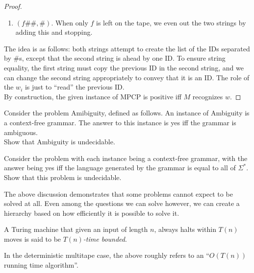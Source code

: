\begin{proof}
\begin{enumerate}
			\item $(f\#\#,\#)$. When only $f$ is left on the tape, we even out the two strings by adding this and stopping.
		\end{enumerate}
		The idea is as follows: both strings attempt to create the list of the IDs separated by $\#$s, except that the second string is ahead by one ID. To ensure string equality, the first string must copy the previous ID in the second string, and we can change the second string appropriately to convey that it is an ID. The role of the $w_i$ is just to ``read'' the previous ID.\\
		By construction, the given instance of \textsf{MPCP} is positive iff $M$ recognizes $w$.
	\end{proof}

	\begin{exercise}
		Consider the problem \textsf{Amibiguity}, defined as follows. An instance of \textsf{Ambiguity} is a context-free grammar. The answer to this instance is yes iff the grammar is ambiguous.\\
		Show that \textsf{Ambiguity} is undecidable.
	\end{exercise}


	\begin{exercise}
		Consider the problem with each instance being a context-free grammar, with the answer being yes iff the language generated by the grammar is equal to all of $\Sigma^*$. Show that this problem is undecidable.
	\end{exercise}

	The above discussion demonstrates that some problems cannot expect to be solved at all. Even among the questions we can solve however, we can create a hierarchy based on how efficiently it is possible to solve it.

	\begin{definition}
		A Turing machine that given an input of length $n$, always halts within $T(n)$ moves is said to be \emph{$T(n)$-time bounded}.
	\end{definition}
	In the deterministic multitape case, the above roughly refers to an ``$O(T(n))$ running time algorithm''.

